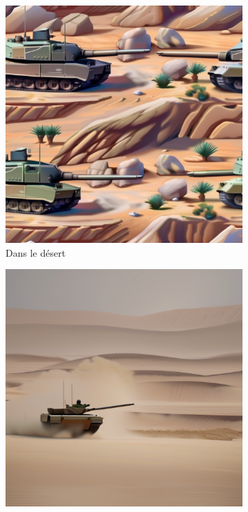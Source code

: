 \begin{figure}[H]
    \centering
    \begin{subfigure}[b]{0.49\textwidth}
        \centering
        \includegraphics[width=\textwidth]{./images/xl_tank-desert-3.png}
        \caption{Dans le désert}
    \end{subfigure}
    \begin{subfigure}[b]{0.49\textwidth}
        \centering
        \includegraphics[width=\textwidth]{./images/xl_tank-desert_storm-2.png}

\end{subfigure}
\end{figure}
